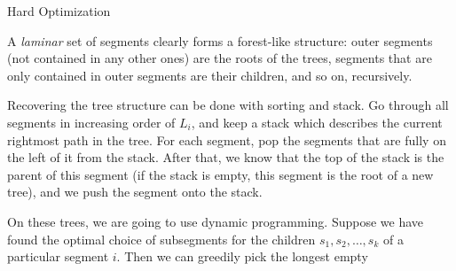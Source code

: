 \begin{tutorial}{Hard Optimization}

A \emph{laminar} set of segments clearly forms a forest-like structure: outer segments (not contained in any other ones) are the roots of the trees, segments that are only contained in outer segments are their children, and so on, recursively.

Recovering the tree structure can be done with sorting and stack. Go through all segments in increasing order of $L_i$, and keep a stack which describes the current rightmost path in the tree. For each segment, pop the segments that are fully on the left of it from the stack. After that, we know that the top of the stack is the parent of this segment (if the stack is empty, this segment is the root of a new tree), and we push the segment onto the stack.

On these trees, we are going to use dynamic programming. Suppose we have found the optimal choice of subsegments for the children $s_1, s_2, \ldots, s_k$ of a particular segment $i$. Then we can greedily pick the longest empty

\end{tutorial}
